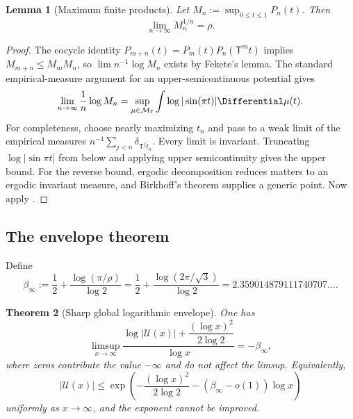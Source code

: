 \documentclass[11pt,oneside]{article}
\newtheorem{theorem}{Theorem}[section]
\newtheorem{lemma}[theorem]{Lemma}
\theoremstyle{definition}
\theoremstyle{remark}
\newcommand{\Uhat}{\mathcal U}
\newcommand{\T}{\mathsf T}
\begin{document}
\begin{lemma}[Maximum finite products]\label{lem:Mn}
Let $M_n:=\sup_{0\le t\le1}P_n(t)$.  Then
\begin{equation}\label{eq:Mn-limit}
 \lim_{n\to\infty}M_n^{1/n}=\rho.
\end{equation}
\end{lemma}

\begin{proof}
The cocycle identity
$P_{m+n}(t)=P_m(t)P_n(\T^mt)$ implies $M_{m+n}\le M_mM_n$, so
$\lim n^{-1}\log M_n$ exists by Fekete's lemma.  The standard empirical-measure
argument for an upper-semicontinuous potential gives
\[
 \lim_{n\to\infty}\frac1n\log M_n
 =\sup_{\mu\in\mathcal M_\T}
 \int\log|\sin(\pi t)|\Differential\mu(t).
\]
For completeness, choose nearly maximizing $t_n$ and pass to a weak limit of the
empirical measures $n^{-1}\sum_{j<n}\delta_{\T^jt_n}$.  Every limit is invariant.
Truncating $\log|\sin\pi t|$ from below and applying upper semicontinuity gives the
upper bound.  For the reverse bound, ergodic decomposition reduces matters to an ergodic
invariant measure, and Birkhoff's theorem supplies a generic point.  Now apply
.
\end{proof}

\subsection{The envelope theorem}

Define
\begin{equation}\label{eq:beta-infty}
 \beta_\infty
 :=\frac12+\frac{\log(\pi/\rho)}{\log2}
 =\frac12+\frac{\log(2\pi/\sqrt3)}{\log2}
 =2.359014879111740707\ldots .
\end{equation}

\begin{theorem}[Sharp global logarithmic envelope]\label{thm:envelope}
One has
\begin{equation}\label{eq:global-limsup}
 \limsup_{x\to\infty}
 \frac{
 \log|\Uhat(x)|+\dfrac{(\log x)^2}{2\log2}}
 {\log x}
 =-\beta_\infty,
\end{equation}
where zeros contribute the value $-\infty$ and do not affect the limsup.
Equivalently,
\begin{equation}\label{eq:global-upper-o}
 |\Uhat(x)|\le
 \exp\!\left(-\frac{(\log x)^2}{2\log2}
 -(\beta_\infty-o(1))\log x\right)
\end{equation}
uniformly as $x\to\infty$, and the exponent cannot be improved.
\end{theorem}
\end{document}
